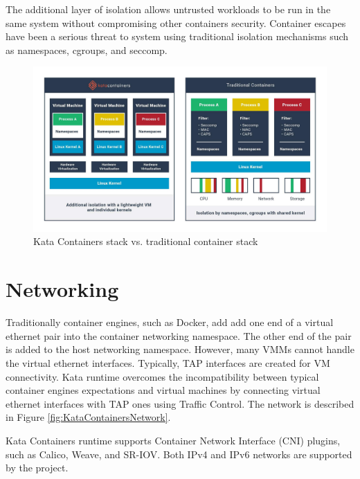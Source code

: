 The additional layer of isolation allows untrusted workloads to be run in the same system without compromising other containers security. Container escapes \cite{CVE-2020-14386}\cite{CVE-2019-5736} have been a serious threat to system using traditional isolation mechanisms such as namespaces, cgroups, and seccomp.

\begin{figure}[ht]
  \begin{center}
    \includegraphics[width=13.5cm]{LaTeX/images/KataContainersStack.jpg}
    \caption{Kata Containers stack vs. traditional container stack \cite{KataContainers}}
    \label{fig:KataContainersStack}
  \end{center}
\end{figure} 

\section{Networking}

Traditionally container engines, such as Docker, add add one end of a virtual ethernet pair into the container networking namespace. The other end of the pair is added to the host networking namespace. However, many VMMs cannot handle the virtual ethernet interfaces. Typically, TAP interfaces are created for VM connectivity. Kata runtime overcomes the incompatibility between typical container engines expectations and virtual machines by connecting virtual ethernet interfaces with TAP ones using Traffic Control. The network is described in Figure \ref{fig:KataContainersNetwork}. \cite{KataContainersArchitecture}

Kata Containers runtime supports Container Network Interface (CNI) \cite{CNI} plugins, such as Calico, Weave, and SR-IOV. Both IPv4 and IPv6 networks are supported by the project.

